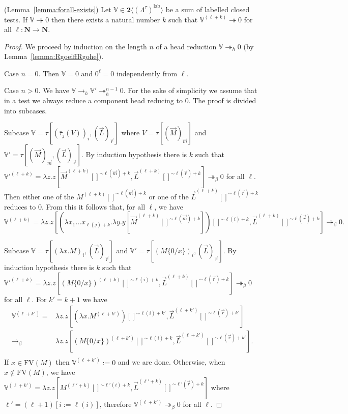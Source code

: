 \documentclass{LMCS}
\newcommand{\nat}{\mathbf{N}}
\newcommand{\bool}{\mathbf{2}}
\newcommand{\lam}{\ensuremath{\lambda}}
\newcommand{\FV}{\mathrm{FV}}
\newcommand{\Set}[1]{\Lambda^{#1}}
\newcommand{\msto}{\twoheadrightarrow}
\newcommand{\subst}[2]{\{ #2 / #1 \}}	\newcommand{\dg}[2]{\mathrm{deg}_{#1}(#2)} \newcommand{\obsle}{\sqsubseteq_{\mathcal{O}}}
\newcommand{\ass}{:=}
\newcommand{\seq}[1]{\vec{#1}}
\newcommand{\sV}{\mathbb{V}}
\newcommand{\gb}{\beta}
\newcommand{\gt}{\ensuremath{\tau}}
\newcommand{\gto}{\ensuremath{\bar\tau}}
\newcommand\lab{\mathrm{lab}}
\begin{document}
\begin{lem}(Lemma~\ref{lemma:forall-exists})
Let $\sV\in\bool\langle(\Set{\gt})^\lab\rangle$ be a sum of labelled closed tests. 
If $\sV\msto 0$ then there exists a natural number $k$ such that $\sV^{(\ell+k)}\msto 0$ for all $\ell:\nat\to\nat$.
\end{lem}

\begin{proof}We proceed by induction on the length $n$ of a head reduction $\sV\msto_h 0$ (by Lemma~\ref{lemma:RgoeiffRgohe}).

Case $n=0$. Then $\sV = 0$ and $0^\ell = 0$ independently from $\ell$.

Case $n > 0$. We have $\sV\to_h \sV'\msto^{n-1}_h 0$. For the sake of simplicity we assume that in a test 
we always reduce a component head reducing to 0.
The proof is divided into subcases.

Subcase $\sV = \gt[(\gto_j(V))_i,(\seq L)_{\seq r}]$ where $V=\gt[(\seq M)_{\seq m}]$ and 
$\sV' = \gt[(\seq M)_{\seq m},(\seq L)_{\seq r}]$. 
By induction hypothesis there is $k$ such that $\sV'^{(\ell +k)} = 
\lam z.z[\seq M^{(\ell +k)}[]^{\sim\ell(\seq m) + k},\seq L^{(\ell +k)}[]^{\sim\ell(\seq r) + k}]\msto_\beta 0$ for all $\ell$. 
Then either one of the $M^{(\ell +k)}[]^{\sim\ell(\seq m) + k}$ or one of the $\seq L^{(\ell +k)}[]^{\sim\ell(\seq r) + k}$ reduces to 0.
From this it follows that, for all $\ell$, we have
$$
	\sV^{(\ell + k)} = \lam z.z[(\lam x_1\ldots x_{\ell(j) +k}.\lam y.y[\seq M^{(\ell +k)}[]^{\sim\ell(\seq m)+k}]) []^{\sim \ell(i) + k},\seq L^{(\ell +k)}[]^{\sim\ell(\seq r) +k}]\msto_\beta 0.
$$

Subcase $\sV = \gt[(\lam x. M)_i,(\seq L)_{\seq r}]$ and $\sV' = \gt[(M\subst{x}{0})_i,(\seq L)_{\seq r}]$.
By induction hypothesis there is $k$ such that $\sV'^{(\ell+k)} = \lam z.z[ (M\subst{x}{0})^{(\ell+k)}[]^{\sim\ell(i)+k}, \seq L^{(\ell+k)}[]^{\sim\ell(\seq r)+k}]\msto_\beta 0$ for all $\ell$.
For $k' = k+1$ we have 
$$
\begin{array}{rl}
\sV^{(\ell+k')} = &\lam z.z[(\lam x. M^{(\ell + k')})[]^{\sim\ell(i)+k'}, \seq L^{(\ell+k')}[]^{\sim \ell(\seq r) + k'}]\\
\to_\gb &\lam z.z[(M\subst{x}{0})^{(\ell+k')}[]^{\sim\ell(i)+k}, \seq L^{(\ell+k')}[]^{\sim \ell(\seq r) + k'}].\\
\end{array}
$$
If $x\in\FV(M)$ then $\sV^{(\ell+k')}\ass 0$ and we are done. 
Otherwise, when $x\notin\FV(M)$, we have 
$\sV^{(\ell+k')}=\lam z.z[M^{(\ell'+k)}[]^{\sim\ell'(i)+k}, \seq L^{(\ell'+k)}[]^{\sim\ell'(\seq r)+k}]$ where $\ell'=(\ell + 1)[i:=\ell(i)]$,
therefore $\sV^{(\ell+k')}\msto_\beta 0$ for all $\ell$.


\end{proof}
\end{document}
